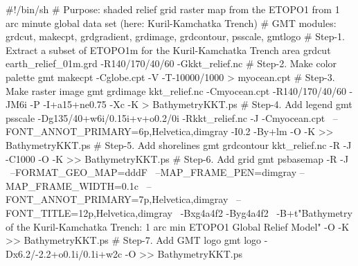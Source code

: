 #!/bin/sh
# Purpose: shaded relief grid raster map from the ETOPO1 from 1 arc minute global data set (here: Kuril-Kamchatka Trench)
# GMT modules: grdcut, makecpt, grdgradient, grdimage, grdcontour, psscale, gmtlogo
# Step-1. Extract a subset of ETOPO1m for the Kuril-Kamchatka Trench area 
grdcut earth_relief_01m.grd -R140/170/40/60 -Gkkt_relief.nc
# Step-2. Make color palette 
gmt makecpt -Cglobe.cpt -V -T-10000/1000 > myocean.cpt
# Step-3. Make raster image
gmt grdimage kkt_relief.nc -Cmyocean.cpt -R140/170/40/60 -JM6i -P -I+a15+ne0.75 -Xc -K > BathymetryKKT.ps
# Step-4. Add legend
gmt psscale -Dg135/40+w6i/0.15i+v+o0.2/0i -Rkkt_relief.nc -J -Cmyocean.cpt \
	--FONT_ANNOT_PRIMARY=6p,Helvetica,dimgray -I0.2 -By+lm -O -K >> BathymetryKKT.ps	
# Step-5. Add shorelines
gmt grdcontour kkt_relief.nc -R -J -C1000 -O -K >> BathymetryKKT.ps
# Step-6. Add grid
gmt psbasemap -R -J \
	--FORMAT_GEO_MAP=dddF \
	--MAP_FRAME_PEN=dimgray --MAP_FRAME_WIDTH=0.1c \
	--FONT_ANNOT_PRIMARY=7p,Helvetica,dimgray \
	--FONT_TITLE=12p,Helvetica,dimgray \
	-Bxg4a4f2 -Byg4a4f2 \
	-B+t"Bathymetry of the Kuril-Kamchatka Trench: 1 arc min ETOPO1 Global Relief Model" -O -K >> BathymetryKKT.ps
# Step-7. Add GMT logo
gmt logo -Dx6.2/-2.2+o0.1i/0.1i+w2c -O >> BathymetryKKT.ps